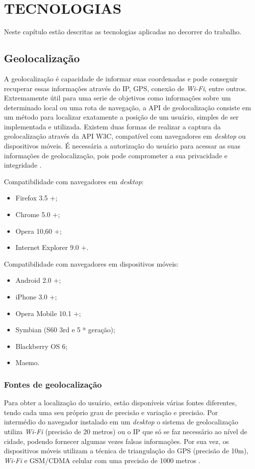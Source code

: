 
\chapter{TECNOLOGIAS}
Neste capítulo estão descritas as tecnologias aplicadas no decorrer do trabalho.

\section{Geolocalização}
A geolocalização é capacidade de informar suas coordenadas e pode conseguir recuperar essas informações através do IP, GPS, conexão de \textit{Wi-Fi}, entre outros. Extremamente útil para uma serie de objetivos como informações sobre um determinado local ou uma rota de navegação, a API de geolocalização consiste em um método para localizar exatamente a posição de um usuário, simples de ser implementada e utilizada. Existem duas formas de realizar a captura da geolocalização através da API W3C, compatível com navegadores em \textit{desktop} ou dispositivos móveis. É necessária a autorização do usuário para acessar as suas informações de geolocalização, pois pode comprometer a sua privacidade e integridade \cite{geolocalizacao:2011}.

Compatibilidade com navegadores em \textit{desktop}:
\begin{itemize}
    \item Firefox 3.5 +;
    \item Chrome 5.0 +;
    \item Opera 10,60 +;
    \item Internet Explorer 9.0 +.
\end{itemize}

Compatibilidade com navegadores em dispositivos móveis:
\begin{itemize}
    \item Android 2.0 +;
    \item iPhone 3.0 +;
    \item Opera Mobile 10.1 +;
    \item Symbian (S60 3rd e 5 ª geração);
    \item Blackberry OS 6;
    \item Maemo.
\end{itemize}

\subsection{Fontes de geolocalização}
Para obter a localização do usuário, estão disponíveis várias fontes diferentes, tendo cada uma seu próprio grau de precisão e variação e precisão. Por intermédio do navegador instalado em um \textit{desktop} o sistema de geolocalização utiliza \textit{Wi-Fi} (precisão de 20 metros) ou o IP que só se faz necessário ao nível de cidade, podendo fornecer algumas vezes falsas informações. Por sua vez, os dispositivos móveis utilizam a técnica de triangulação do GPS (precisão de 10m), \textit{Wi-Fi} e GSM/CDMA celular com uma precisão de 1000 metros \cite{geolocalizacao:2011}.

